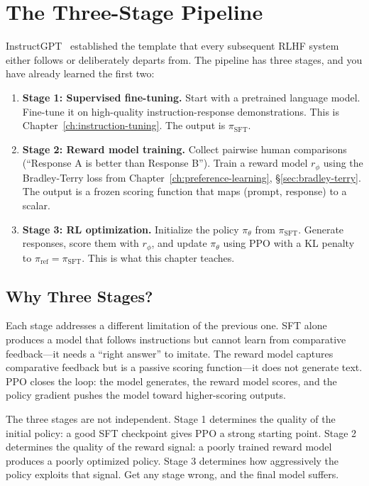 \section{The Three-Stage Pipeline}
\label{sec:three-stage}

InstructGPT~\cite{ouyang2022instructgpt} established the template that every subsequent RLHF system either follows or deliberately departs from. The pipeline has three stages, and you have already learned the first two:

\begin{enumerate}[nosep]
  \item \textbf{Stage 1: Supervised fine-tuning.} Start with a pretrained language model. Fine-tune it on high-quality instruction-response demonstrations. This is Chapter~\ref{ch:instruction-tuning}. The output is $\pi_{\text{SFT}}$.
  \item \textbf{Stage 2: Reward model training.} Collect pairwise human comparisons (``Response A is better than Response B''). Train a reward model $r_\phi$ using the Bradley-Terry loss from Chapter~\ref{ch:preference-learning}, \S\ref{sec:bradley-terry}. The output is a frozen scoring function that maps (prompt, response) to a scalar.
  \item \textbf{Stage 3: RL optimization.} Initialize the policy $\pi_\theta$ from $\pi_{\text{SFT}}$. Generate responses, score them with $r_\phi$, and update $\pi_\theta$ using PPO with a KL penalty to $\pi_{\text{ref}} = \pi_{\text{SFT}}$. This is what this chapter teaches.
\end{enumerate}

\subsection{Why Three Stages?}

Each stage addresses a different limitation of the previous one. SFT alone produces a model that follows instructions but cannot learn from comparative feedback---it needs a ``right answer'' to imitate. The reward model captures comparative feedback but is a passive scoring function---it does not generate text. PPO closes the loop: the model generates, the reward model scores, and the policy gradient pushes the model toward higher-scoring outputs.

The three stages are not independent. Stage 1 determines the quality of the initial policy: a good SFT checkpoint gives PPO a strong starting point. Stage 2 determines the quality of the reward signal: a poorly trained reward model produces a poorly optimized policy. Stage 3 determines how aggressively the policy exploits that signal. Get any stage wrong, and the final model suffers.

